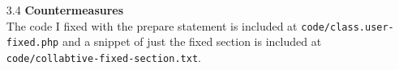 \documentclass[11pt, letterpaper]{article}
\newcommand{\code}[1]{\texttt{#1}}
\begin{document}
\begin{itemize}
\begin{itemize}
            \item[3.4 ]\textbf{Countermeasures}\\
                The code I fixed with the prepare statement is included at \code{code/class.user-fixed.php} and a snippet of just the fixed section is included at \code{code/collabtive-fixed-section.txt}.
        \end{itemize}
\end{itemize}
\end{document}
